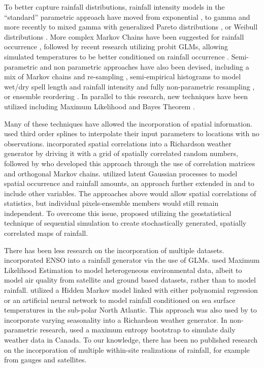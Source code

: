\documentclass[12pt]{article}
\begin{document}
To better capture rainfall distributions, rainfall intensity models in the ``standard'' parametric approach have moved from exponential \citep{Richardson1981}, to gamma \citep{Thom1958, Katz1977, Buishand1978, Coe1984, Wilks1992} and more recently to mixed gamma with generalized Pareto distributions \citep{Lennartsson2008}, or Weibull distributions \citep{Wilks1989, Furrer2008}.  More complex  Markov Chains have been suggested for rainfall occurrence \citep{Jones1993, Dastidar2010}, followed by recent research utilizing probit GLMs, allowing simulated temperatures to be better conditioned on rainfall occurrence \citep{Verdin2015}. Semi-parametric and non parametric approaches have also been devised, including a mix of Markov chains and re-sampling \citep{Apipattanavis2007}, semi-empirical histograms to model wet/dry spell length and rainfall intensity \citep{Racsko1991, Semenov2008} and fully non-parametric resampling \citep{Young1994,Lall1996, Rajagopalan1999}, or ensemble reordering \citep{Ghile2009}. In parallel to this research, new techniques have been utilized including Maximum Likelihood \citep{Fasso2011} and Bayes Theorem \citep{Sanso2000}.

Many of these techniques have allowed the incorporation of spatial information. \citet{Jones1993} used third order splines to interpolate their input parameters to locations with no observations. \citet{Wilks1998} incorporated spatial correlations into a Richardson weather generator by driving it with a grid of spatially correlated random numbers, followed by \citet{Baigorria2010} who developed this approach through the use of correlation matrices and orthogonal Markov chains.  \citet{Kleiber2012} utilized latent Gaussian processes to model spatial occurrence and rainfall amounts, an approach further extended in \citet{Kleiber2012} and \citet{Verdin2015} to include other variables. The approaches above would allow spatial correlations of statistics, but individual pixels-ensemble members would still remain independent. To overcome this issue, \citet{Greatrex2012} proposed utilizing the geostatistical technique of sequential simulation to create stochastically generated, spatially correlated maps of rainfall. 

There has been less research on the incorporation of multiple datasets. \citet{Furrer2008} incorporated ENSO into a rainfall generator via the use of GLMs. \citet{Fasso2011} used Maximum Likelihood Estimation to model heterogeneous environmental data, albeit to model air quality from satellite and ground based datasets, rather than to model rainfall. \citet{Hauser2013} utilized a Hidden Markov model linked with either polynomial regression or an artificial neural network to model rainfall conditioned on sea surface temperatures in the sub-polar North Atlantic.  This approach was also used by \citet{CareySmith2014} to incorporate varying seasonality into a Richardson weather generator.  In non-parametric research, \citet{Srivastav2015} used a maximum entropy bootstrap to simulate daily weather data in Canada.   To our knowledge, there has been no published research on the incorporation of multiple within-site realizations of rainfall, for example from gauges and satellites. 
\end{document}
